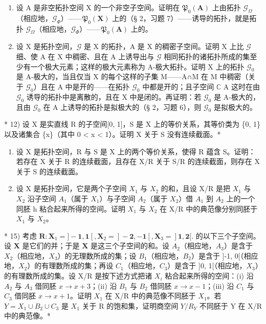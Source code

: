 \begin{enumerate}
\def\labelenumi{\arabic{enumi})}
\setcounter{enumi}{9}
\item
  设 A 是非空拓扑空间 X 的一个非空子空间。证明在 \(\mathfrak{P}_{0}(\mathbf{A})\) 上由拓扑 \(\mathcal{G}_{\Omega}\)（相应地，\(\mathcal{G}_{\Phi}\)）——\(\mathfrak{P}_{0}(\mathbf{X})\) 上的（§ 2，习题 7）——诱导的拓扑，就是拓扑 \(\mathcal{G}_{\Omega}\)（相应地，\(\mathcal{G}_{\Phi}\)）——\(\mathfrak{P}_{0}(\mathbf{A})\) 上的。
\item
  设 X 是拓扑空间，\(\mathcal{G}\) 是 X 的拓扑，A 是 X 的稠密子空间。证明 X 上比 \(\mathcal{G}\) 细、使 A 在 X 中稠密、且在 A 上诱导出与 \(\mathcal{G}\) 相同拓扑的诸拓扑所成的集至少有一个极大元素；这样的极大元素称为 A-极大拓扑。证明 X 上的拓扑 \(\mathcal{G}_0\) 是 A-极大的，当且仅当 X 的每个这样的子集 M——A∩M 在 M 中稠密（关于 \(\mathcal{G}_0\)）且在 A 中是开的——在拓扑 \(\mathcal{G}_0\) 中都是开的；且子空间 \(\mathbb{C}\) A 这时在由 \(\mathcal{G}_0\) 诱导的拓扑中是离散的，且在 X 中是闭的。再证明：若 \(\mathcal{G}_0\) 是 A-极大的，且由 \(\mathcal{G}_0\) 在 A 上诱导的拓扑是拟极大的（§ 2，习题 6），则 \(\mathcal{G}_0\) 是拟极大的。
\end{enumerate}

* 12) 设 X 是实直线 R 的子空间{[}0, 1{]}，S 是 X 上的等价关系，其等价类为 \{0, 1\} 以及诸集合 \{x\}（其中 0 \textless{} x \textless{} 1）。证明 X 关于 S 没有连续截面。*

\begin{enumerate}
\def\labelenumi{\arabic{enumi})}
\setcounter{enumi}{12}
\item
  设 X 是拓扑空间，R 与 S 是 X 上的两个等价关系，使得 R 蕴含 S。证明：若存在 X 关于 R 的连续截面，且存在 X/R 关于 S/R 的连续截面，则存在 X 关于 S 的连续截面。
\item
  设 X 是拓扑空间，它是两个子空间 \(X_{1}\) 与 \(X_{2}\) 的和，且设 X/R 是把 \(X_{1}\) 与 \(X_{2}\) 沿子空间 \(A_{1}\)（属于 \(X_{1}\)）与子空间 \(A_{2}\)（属于 \(X_{2}\)）借 \(A_{1}\) 到 \(A_{2}\) 上的一个同胚 h 粘合起来所得的空间。证明 \(X_{1}\) 与 \(X_{2}\) 在 X/R 中的典范像分别同胚于 \(X_{1}\) 与 \(X_{2}\)。
\end{enumerate}

* 15) 考虑 \(\mathbf{R}: \mathbf{X}_1 = ] - \mathbf{1}, \mathbf{1}[, \mathbf{X}_2 = ] - \mathbf{2}, -\mathbf{1}[, \mathbf{X}_3 = ]\mathbf{1}, \mathbf{2}[.\) 的以下三个子空间。设 \(\mathbf{X}\) 是它们的并；于是 \(\mathbf{X}\) 是这三个子空间的和。设 \(A_{2}\)（相应地，\(A_{3}\)）是含于 \(X_{2}\)（相应地，\(X_{3}\)）的无理数所成的集；设 \(B_{1}\)（相应地，\(B_{2}\)）是含于 {]}-1, 0{[}（相应地，\(X_{2}\)）的有理数所成的集；再设 \(C_{1}\)（相应地，\(C_{3}\)）是含于 {]}0, 1{[}（相应地，\(X_{3}\)）的有理数所成的集。设 X/R 是按下述方式把诸 \(X_{i}\) 粘合起来所得的空间：(i) 沿 \(A_{2}\) 与 \(A_{3}\) 借同胚 \(x \to x + 3\)；(ii) 沿 \(B_{1}\) 与 \(B_{2}\) 借同胚 \(x \to x - 1\)；(iii) 沿 \(C_{1}\) 与 \(C_{3}\) 借同胚 \(x \to x + 1\)。证明 \(X_{1}\) 在 X/R 中的典范像不同胚于 \(X_{1}\)。若 \(Y = X_{1} \cup B_{2} \cup C_{3}\) 是 \(X_{1}\) 关于 R 的饱和集，证明商空间 \(Y/R_{Y}\) 不同胚于 Y 在 X/R 中的典范像。*

